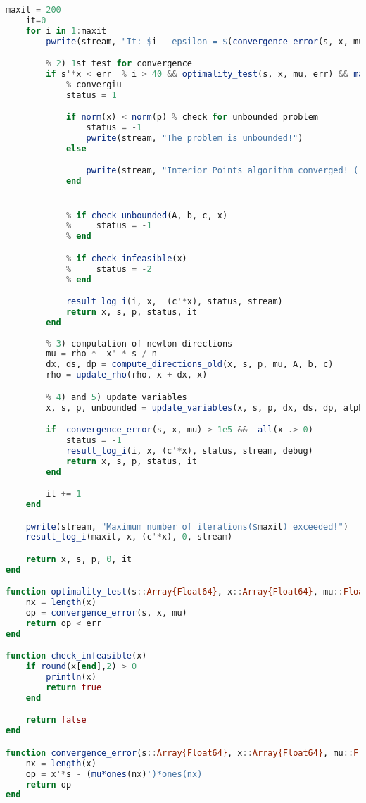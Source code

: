 \documentclass[a4paper]{IEEEtran}
\begin{document}
\begin{lstlisting}[language=Julia,numbers=none]
    maxit = 200
    it=0
    for i in 1:maxit
        pwrite(stream, "It: $i - epsilon = $(convergence_error(s, x, mu)) - x = $x", debug)

        % 2) 1st test for convergence
        if s'*x < err  % i > 40 && optimality_test(s, x, mu, err) && maximum(abs.(dx)) < err
            % convergiu
            status = 1

            if norm(x) < norm(p) % check for unbounded problem
                status = -1
                pwrite(stream, "The problem is unbounded!")
            else

                pwrite(stream, "Interior Points algorithm converged! ( s*x criteria)")
            end


            % if check_unbounded(A, b, c, x)
            %     status = -1
            % end

            % if check_infeasible(x)
            %     status = -2
            % end

            result_log_i(i, x,  (c'*x), status, stream)
            return x, s, p, status, it
        end
        
        % 3) computation of newton directions
        mu = rho *  x' * s / n 
        dx, ds, dp = compute_directions_old(x, s, p, mu, A, b, c)
        rho = update_rho(rho, x + dx, x)

        % 4) and 5) update variables
        x, s, p, unbounded = update_variables(x, s, p, dx, ds, dp, alpha)

        if  convergence_error(s, x, mu) > 1e5 &&  all(x .> 0)
            status = -1
            result_log_i(i, x, (c'*x), status, stream, debug)
            return x, s, p, status, it
        end

        it += 1
    end

    pwrite(stream, "Maximum number of iterations($maxit) exceeded!")
    result_log_i(maxit, x, (c'*x), 0, stream)

    return x, s, p, 0, it
end

function optimality_test(s::Array{Float64}, x::Array{Float64}, mu::Float64, err::Float64)
    nx = length(x)
    op = convergence_error(s, x, mu)
    return op < err
end

function check_infeasible(x)
    if round(x[end],2) > 0
        println(x)
        return true
    end

    return false
end

function convergence_error(s::Array{Float64}, x::Array{Float64}, mu::Float64)
    nx = length(x)
    op = x'*s - (mu*ones(nx)')*ones(nx)
    return op
end


\end{lstlisting}
\end{document}
